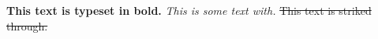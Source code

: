 \documentclass[12pt]{article}
\begin{document}
\textbf{This text is typeset in bold.}
\emph{This is some text with.}
\sout{This text is striked through.}
\end{document}
